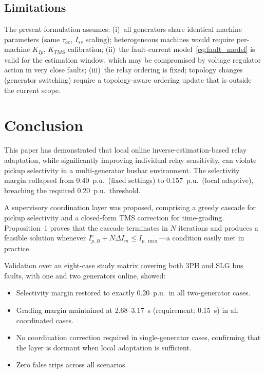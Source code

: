 \documentclass[journal,twoside,letterpaper]{IEEEtran}
\begin{document}
\subsection{Limitations}

The present formulation assumes:
(i)~all generators share identical machine parameters
(same $\tau_{ac}$, $I_{ss}$ scaling); heterogeneous
machines would require per-machine $K_{Ip}$, $K_{TMS}$
calibration;
(ii)~the fault-current model~\eqref{eq:fault_model}
is valid for the estimation window, which may be
compromised by voltage regulator action in very close
faults;
(iii)~the relay ordering is fixed; topology changes
(generator switching) require a topology-aware ordering
update that is outside the current scope.

\section{Conclusion}
\label{sec:conclusion}

This paper has demonstrated that local online
inverse-estimation-based relay adaptation, while
significantly improving individual relay sensitivity,
can violate pickup selectivity in a multi-generator
busbar environment.
The selectivity margin collapsed from 0.40~p.u.\
(fixed settings) to 0.157~p.u.\ (local adaptive),
breaching the required 0.20~p.u.\ threshold.

A supervisory coordination layer was proposed, comprising
a greedy cascade for pickup selectivity and a
closed-form TMS correction for time-grading.
Proposition~1 proves that the cascade terminates in $N$
iterations and produces a feasible solution whenever
$I_{p,B}^c + N\Delta I_m \leq I_{p,\max}$---a condition
easily met in practice.

Validation over an eight-case study matrix covering
both 3PH and SLG bus faults, with one and two generators
online, showed:
\begin{itemize}
  \item Selectivity margin restored to exactly 0.20~p.u.\
    in all two-generator cases.
  \item Grading margin maintained at 2.68--3.17~s
    (requirement: 0.15~s) in all coordinated cases.
  \item No coordination correction required in
    single-generator cases, confirming that the layer
    is dormant when local adaptation is sufficient.
  \item Zero false trips across all scenarios.
\end{itemize}
\end{document}
